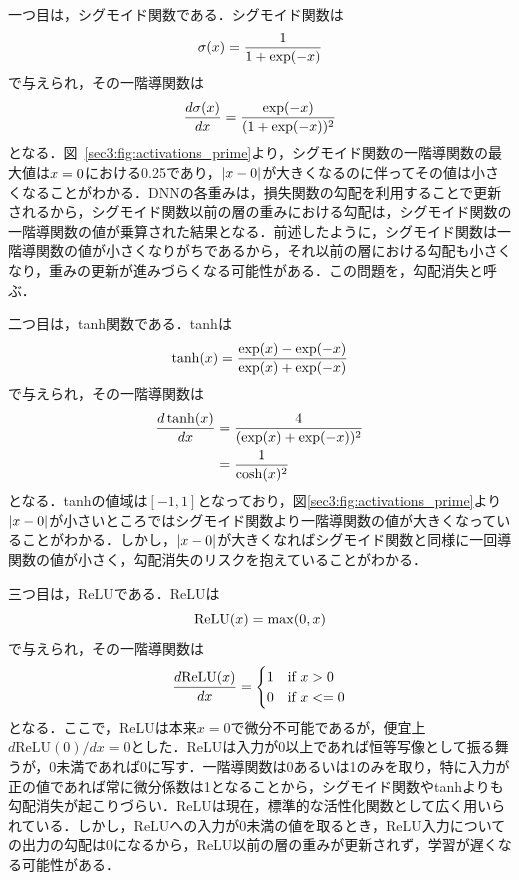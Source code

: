 \documentclass[12pt]{jarticle}
\numberwithin{equation}{section}    %
\numberwithin{figure}{section}      %
\numberwithin{table}{section}      %
\begin{document}
一つ目は，シグモイド関数である．シグモイド関数は
\begin{equation}
    \sigma(x) = \frac{1}{1 + \exp(-x)}
\end{equation}
で与えられ，その一階導関数は
\begin{equation}
    \frac{d\sigma(x)}{dx} = \frac{\exp(-x)}{(1 + \exp(-x))^{2}}
\end{equation}
となる．図~\ref{sec3:fig:activations_prime}より，シグモイド関数の一階導関数の最大値は$x=0$における0.25であり，$|x - 0|$が大きくなるのに伴ってその値は小さくなることがわかる．DNNの各重みは，損失関数の勾配を利用することで更新されるから，シグモイド関数以前の層の重みにおける勾配は，シグモイド関数の一階導関数の値が乗算された結果となる．前述したように，シグモイド関数は一階導関数の値が小さくなりがちであるから，それ以前の層における勾配も小さくなり，重みの更新が進みづらくなる可能性がある．この問題を，勾配消失と呼ぶ．

二つ目は，tanh関数である．tanhは
\begin{equation}
    \tanh(x) = \frac{\exp(x) - \exp(-x)}{\exp(x) + \exp(-x)}
\end{equation}
で与えられ，その一階導関数は
\begin{align}
    \frac{d\tanh(x)}{dx} & = \frac{4}{(\exp(x) + \exp(-x))^{2}} \\
                                   & = \frac{1}{\cosh(x)^{2}}
\end{align}
となる．tanhの値域は$[-1, 1]$となっており，図\ref{sec3:fig:activations_prime}より$|x - 0|$が小さいところではシグモイド関数より一階導関数の値が大きくなっていることがわかる．しかし，$|x - 0|$が大きくなればシグモイド関数と同様に一回導関数の値が小さく，勾配消失のリスクを抱えていることがわかる．

三つ目は，ReLUである．ReLUは
\begin{equation}
    \text{ReLU}(x) = \max (0, x)
\end{equation}
で与えられ，その一階導関数は
\begin{equation}
    \frac{d\text{ReLU}(x)}{dx} =
    \begin{cases}
        1 & \text{if $x > 0$}  \\
        0 & \text{if $x <= 0$}
    \end{cases}
\end{equation}
となる．ここで，ReLUは本来$x = 0$で微分不可能であるが，便宜上$d\text{ReLU}(0) / dx = 0$とした．ReLUは入力が0以上であれば恒等写像として振る舞うが，0未満であれば0に写す．一階導関数は0あるいは1のみを取り，特に入力が正の値であれば常に微分係数は1となることから，シグモイド関数やtanhよりも勾配消失が起こりづらい．ReLUは現在，標準的な活性化関数として広く用いられている．しかし，ReLUへの入力が0未満の値を取るとき，ReLU入力についての出力の勾配は0になるから，ReLU以前の層の重みが更新されず，学習が遅くなる可能性がある．
\end{document}
